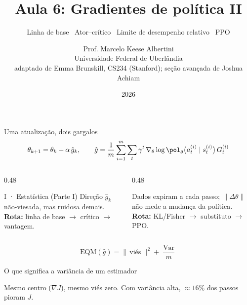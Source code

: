 \documentclass[aspectratio=169, 11pt]{beamer}
\title[Aula 6 — Gradientes de política II]{Aula 6: Gradientes de política II}
\subtitle[Aprendizagem por Reforço]{Linha de base \textbullet\ Ator--crítico \textbullet\ Limite de desempenho relativo \textbullet\ PPO}
\author[Prof. Marcelo K. Albertini]{Prof. Marcelo Keese Albertini \\
  \footnotesize Universidade Federal de Uberlândia \\
  \footnotesize adaptado de Emma Brunskill, CS234 (Stanford); seção avançada de Joshua Achiam}
\institute{Universidade Federal de Uberlândia}
\date{2026}
\newcommand{\ghat}{\hat{g}}
\newcommand{\Var}{\operatorname{Var}}
\begin{document}
\begin{frame}\titlepage\end{frame}

\begin{frame}{Uma atualização, dois gargalos}
  \[
    \theta_{k+1} = \theta_k + \alpha\,\ghat_k,
    \qquad
    \ghat = \frac{1}{m}\sum_{i=1}^{m}\sum_{t}\gamma^t\,
      \nabla_\theta\log\pol_\theta\big(a_t^{(i)}\mid s_t^{(i)}\big)\,G_t^{(i)}
  \]

  \begin{columns}[T]
    \begin{column}{0.48\textwidth}
      \begin{teobox}{I · Estatística (Parte I)}
        \small Direção $\ghat_k$ não-viesada, mas ruidosa demais.\\
        \textbf{Rota:} linha de base $\to$ crítico $\to$ vantagem.
      \end{teobox}
    \end{column}
    \begin{column}{0.48\textwidth}
      \begin{exbox}[title={II · Geometria (Parte II)}]{}
        \small Dados expiram a cada passo; $\|\Delta\theta\|$ não mede a mudança da política.\\
        \textbf{Rota:} KL/Fisher $\to$ substituto $\to$ PPO.
      \end{exbox}
    \end{column}
  \end{columns}

  \begin{alertabox}[title={Não-viesado não significa utilizável}]
    \[
      \mathrm{EQM}(\ghat) = \big\|\,\text{viés}\,\big\|^2 + \frac{\Var}{m}
    \]
  \end{alertabox}
\end{frame}

\begin{frame}{O que significa a variância de um estimador}
  \begin{center}
    
  \end{center}
  \begin{ideiabox}
    Mesmo centro ($\nabla J$), mesmo viés zero. Com variância alta,
    \alert{$\approx 16\%$ dos passos} pioram $J$.
  \end{ideiabox}
\end{frame}
\end{document}
